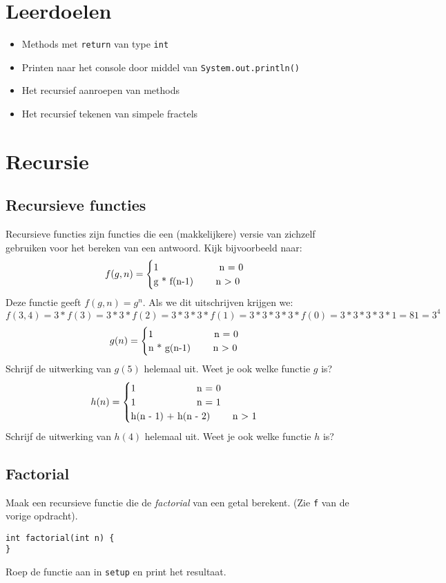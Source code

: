 \newcommand{\tttt}{Recursie}
\newcommand{\dddd}{Datum 1}



\section{Leerdoelen}
\begin{itemize}
    \item Methods met \texttt{return} van type \texttt{int}
    \item Printen naar het console door middel van \texttt{System.out.println()}
    \item Het recursief aanroepen van methods
    \item Het recursief tekenen van simpele fractels
\end{itemize}
\section{Recursie}
\subsection{Recursieve functies}
Recursieve functies zijn functies die een (makkelijkere) versie van zichzelf gebruiken voor het bereken van een antwoord. Kijk bijvoorbeeld naar:
\[f(g,n) = \begin{cases}
        $1 \qquad\qquad\qquad n = 0$\\
        $g * f(n-1)  \qquad n $>$ 0$
    \end{cases}
   \]
Deze functie geeft $f(g,n) = g^n$. Als we dit uitschrijven krijgen we: $f(3,4) = 3 * f(3) = 3 * 3 * f(2) = 3 * 3 * 3 * f(1) = 3 * 3 * 3 * 3 * f(0) = 3 * 3 * 3 * 3 * 1 = 81 = 3^4$
\[g(n) = \begin{cases}
        $1 \qquad\qquad\qquad n = 0$\\
        $n * g(n-1)  \qquad n $>$ 0$
    \end{cases}
   \]
Schrijf de uitwerking van $g(5)$ helemaal uit. Weet je ook welke functie $g$ is?
\[h(n) = \begin{cases}
        $1 \qquad\qquad\qquad n = 0$\\
        $1 \qquad\qquad\qquad n = 1$\\
        $h(n - 1) + h(n - 2)  \qquad n $>$ 1$
    \end{cases}
   \]
Schrijf de uitwerking van $h(4)$ helemaal uit. Weet je ook welke functie $h$ is?

\subsection{Factorial}
Maak een recursieve functie die de \textit{factorial} van een getal berekent. (Zie \texttt{f} van de vorige opdracht). 
\begin{lstlisting}
int factorial(int n) {
}
\end{lstlisting}
Roep de functie aan in \texttt{setup} en print het resultaat. 


